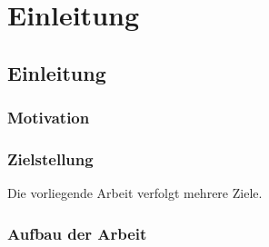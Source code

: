 \chapter{Einleitung}\label{sec:chapter1}

\section{Einleitung}\label{sec:chapter2: Einleitung}

\subsection{Motivation}



\subsection{Zielstellung}

Die vorliegende Arbeit verfolgt mehrere Ziele.

\subsection{Aufbau der Arbeit}

